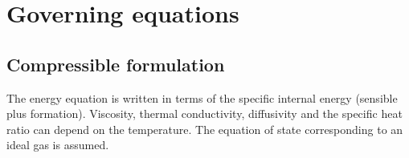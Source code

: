 \chapter{Governing equations}\label{sec:equations}

\section{Compressible formulation}

The energy equation is written in terms of the specific internal energy (sensible plus formation). Viscosity, thermal conductivity, diffusivity and the specific heat ratio can depend on the temperature. The equation of state corresponding to an ideal gas is assumed.

